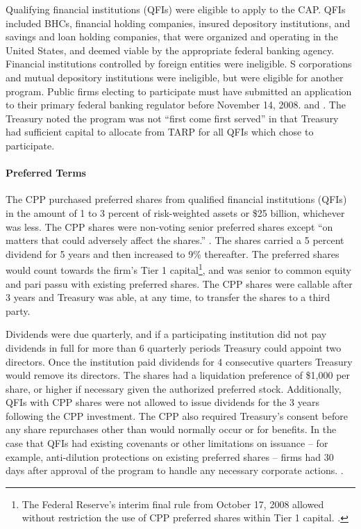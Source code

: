 \documentclass[12pt]{article}
\begin{document}
Qualifying financial institutions (QFIs) were eligible to apply to the CAP. QFIs included BHCs, financial holding companies, insured depository institutions, and savings and loan holding companies, that were organized and operating in the United States, and deemed viable by the appropriate federal banking agency. Financial institutions controlled by foreign entities were ineligible. S corporations and mutual depository institutions were ineligible, but were eligible for another program. Public firms electing to participate must have submitted an application to their primary federal banking regulator before November 14, 2008. \citep{mofo} and \citep{CPPTerms}. The Treasury noted the program was not ``first come first served'' in that Treasury had sufficient capital to allocate from TARP for all QFIs which chose to participate. 

\paragraph{Preferred Terms}

The CPP purchased preferred shares from qualified financial institutions (QFIs) in the amount of 1 to 3 percent of risk-weighted assets or \$25 billion, whichever was less. The CPP shares were non-voting senior preferred shares except ``on matters that could adversely affect the shares.'' \citep{CPPAnnouncement}. The shares carried a 5 percent dividend for 5 years and then increased to 9\% thereafter. The preferred shares would count towards the firm's Tier 1 capital\footnote{The Federal Reserve's interim final rule from October 17, 2008 allowed without restriction the use of CPP preferred shares within Tier 1 capital. \citep{FedTier1}.}, and was senior to common equity and pari passu with existing preferred shares. The CPP shares were callable after 3 years and Treasury was able, at any time, to transfer the shares to a third party. 

Dividends were due quarterly, and if a participating institution did not pay dividends in full for more than 6 quarterly periods Treasury could appoint two directors. Once the institution paid dividends for 4 consecutive quarters Treasury would remove its directors. The shares had a liquidation preference of \$1,000 per share, or higher if necessary given the authorized preferred stock. Additionally, QFIs with CPP shares were not allowed to issue dividends for the 3 years following the CPP investment.  The CPP also required Treasury's consent before any share repurchases other than would normally occur or for benefits. In the case that QFIs had existing covenants or other limitations on issuance -- for example, anti-dilution protections on existing preferred shares --  firms had 30 days after approval of the program to handle any necessary corporate actions. \citep{mofo2}.
\end{document}
